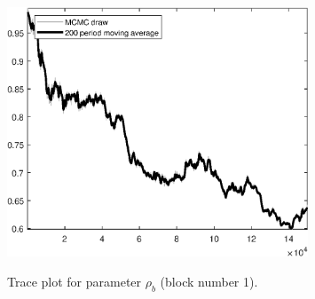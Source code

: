 \begin{figure}[H]
\centering
  \includegraphics[width=0.8\textwidth]{BRS_sectoral_wo_gmf/graphs/TracePlot_rho_b_blck_1}\\
    \caption{Trace plot for parameter ${\rho_b}$ (block number 1).}
\end{figure}
